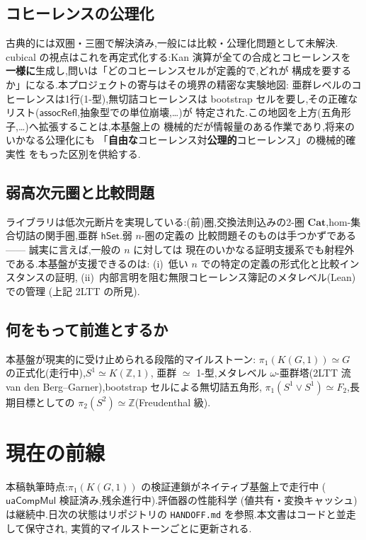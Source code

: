 \documentclass[11pt]{ltjsarticle}
\newcommand{\Z}{\mathbb{Z}}
\newcommand{\op}[1]{\ensuremath{\mathsf{#1}}}
\begin{document}
\subsection{コヒーレンスの公理化}
古典的には双圏・三圏で解決済み,一般には比較・公理化問題として未解決.
cubical の視点はこれを再定式化する:Kan 演算が全ての合成とコヒーレンスを
\textbf{一様に}生成し,問いは「どのコヒーレンスセルが定義的で,どれが
構成を要するか」になる.本プロジェクトの寄与はその境界の精密な実験地図:
亜群レベルのコヒーレンスは1行(1-型),無切詰コヒーレンスは bootstrap
セルを要し,その正確なリスト($\op{assocRefl}$,抽象型での単位崩壊,…)が
特定された.この地図を上方(五角形子,…)へ拡張することは,本基盤上の
機械的だが情報量のある作業であり,将来のいかなる公理化にも
「\textbf{自由な}コヒーレンス対\textbf{公理的}コヒーレンス」の機械的確実性
をもった区別を供給する.

\subsection{弱高次元圏と比較問題}
ライブラリは低次元断片を実現している:(前)圏,交換法則込みの2-圏
$\mathbf{Cat}$,hom-集合切詰の関手圏,亜群 $\op{hSet}$.弱 $n$-圏の定義の
比較問題そのものは手つかずである —— 誠実に言えば,一般の $n$ に対しては
現在のいかなる証明支援系でも射程外である.本基盤が支援できるのは:
(i)~低い $n$ での特定の定義の形式化と比較インスタンスの証明,
(ii)~内部言明を阻む無限コヒーレンス簿記のメタレベル(Lean)での管理
(上記 2LTT の所見).

\subsection{何をもって前進とするか}
本基盤が現実的に受け止められる段階的マイルストーン:
$\pi_1(K(G,1))\simeq G$ の正式化(走行中),$S^1\simeq K(\Z,1)$,
亜群 $\simeq$ 1-型,メタレベル $\omega$-亜群塔(2LTT 流
van den Berg--Garner),bootstrap セルによる無切詰五角形,
$\pi_1(S^1\vee S^1)\simeq F_2$,長期目標としての
$\pi_2(S^2)\simeq\Z$(Freudenthal 級).

\section{現在の前線}
本稿執筆時点:$\pi_1(K(G,1))$ の検証連鎖がネイティブ基盤上で走行中
($\op{uaCompMul}$ 検証済み,残余進行中).評価器の性能科学
(値共有・変換キャッシュ)は継続中.日次の状態はリポジトリの
\texttt{HANDOFF.md} を参照.本文書はコードと並走して保守され,
実質的マイルストーンごとに更新される.
\end{document}
